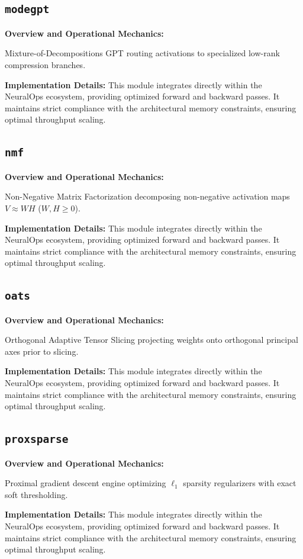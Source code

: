 \documentclass[10pt,twocolumn,letterpaper]{article}
\begin{document}
\subsection{\texttt{modegpt}}
\textbf{Overview and Operational Mechanics:}

Mixture-of-Decompositions GPT routing activations to specialized low-rank compression branches.

\textbf{Implementation Details:}
This module integrates directly within the NeuralOps ecosystem, providing optimized forward and backward passes. It maintains strict compliance with the architectural memory constraints, ensuring optimal throughput scaling.

\subsection{\texttt{nmf}}
\textbf{Overview and Operational Mechanics:}

Non-Negative Matrix Factorization decomposing non-negative activation maps $V \approx W H$ ($W, H \ge 0$).

\textbf{Implementation Details:}
This module integrates directly within the NeuralOps ecosystem, providing optimized forward and backward passes. It maintains strict compliance with the architectural memory constraints, ensuring optimal throughput scaling.

\subsection{\texttt{oats}}
\textbf{Overview and Operational Mechanics:}

Orthogonal Adaptive Tensor Slicing projecting weights onto orthogonal principal axes prior to slicing.

\textbf{Implementation Details:}
This module integrates directly within the NeuralOps ecosystem, providing optimized forward and backward passes. It maintains strict compliance with the architectural memory constraints, ensuring optimal throughput scaling.

\subsection{\texttt{proxsparse}}
\textbf{Overview and Operational Mechanics:}

Proximal gradient descent engine optimizing $\ell_1$ sparsity regularizers with exact soft thresholding.

\textbf{Implementation Details:}
This module integrates directly within the NeuralOps ecosystem, providing optimized forward and backward passes. It maintains strict compliance with the architectural memory constraints, ensuring optimal throughput scaling.
\end{document}
